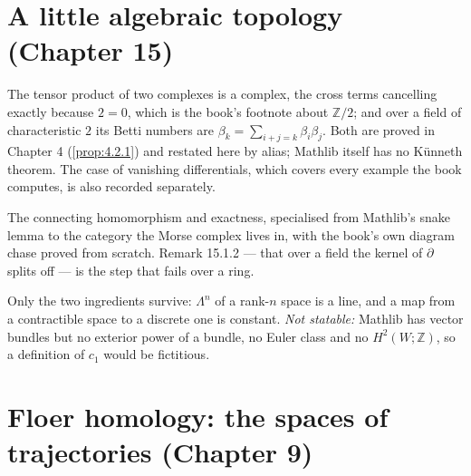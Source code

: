 \chapter{A little algebraic topology (Chapter 15)}

\begin{proposition}
  \label{prop:15.1.1}
  \leanok
  The tensor product of two complexes is a complex, the cross terms cancelling
  exactly because $2 = 0$, which is the book's footnote about $\mathbb{Z}/2$; and
  over a field of characteristic $2$ its Betti numbers are
  $\beta_k = \sum_{i+j=k}\beta_i\beta_j$.  Both are proved in Chapter 4
  (\ref{prop:4.2.1}) and restated here by alias; Mathlib itself has no
  K\"unneth theorem.  The case of vanishing differentials, which covers every
  example the book computes, is also recorded separately.
\end{proposition}

\begin{proposition}
  \label{prop:15.1.b}
  \leanok
  The connecting homomorphism and exactness, specialised from Mathlib's snake
  lemma to the category the Morse complex lives in, with the book's own diagram
  chase proved from scratch.  Remark 15.1.2 --- that over a field the kernel of
  $\partial$ splits off --- is the step that fails over a ring.
\end{proposition}

\begin{proposition}
  \label{prop:15.2}
  \notready
  Only the two ingredients survive: $\Lambda^n$ of a rank-$n$ space is a line, and
  a map from a contractible space to a discrete one is constant.
  \emph{Not statable:} Mathlib has vector bundles but no exterior power of a
  bundle, no Euler class and no $H^2(W;\mathbb{Z})$, so a definition of $c_1$
  would be fictitious.
\end{proposition}

\chapter{Floer homology: the spaces of trajectories (Chapter 9)}

